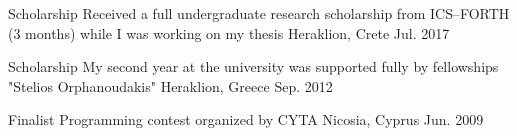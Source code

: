 \begin{cvhonors}
	\cvhonor
	{Scholarship} %
	{Received a full undergraduate research scholarship from
		ICS--FORTH (3 months) while I was working on my thesis} %
	{Heraklion, Crete} %
	{Jul. 2017} %

	\cvhonor
	{Scholarship} %
	{My second year at the university was supported fully by
		fellowships "Stelios Orphanoudakis"} %
	{Heraklion, Greece} %
	{Sep. 2012} %

	\cvhonor
	{Finalist} %
	{Programming contest organized by CYTA} %
	{Nicosia, Cyprus} %
	{Jun. 2009} %

\end{cvhonors}
